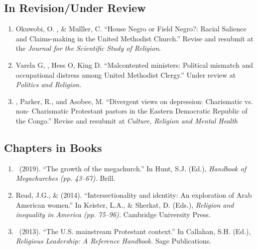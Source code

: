 \subsection*{In Revision/Under Review}
\begin{enumerate}
\item Okuwobi, O. \Eagle, \& Mulller, C. ``House Negro or Field Negro?: Racial Salience and Claims-making in the United Methodist Church.'' Revise and resubmit at the \textit{Journal for the Scientific Study of Religion}.

\item Varela G, \Eagle, Hess O, King D. ``Malcontented ministers: Political mismatch and occupational distress among United Methodist Clergy.'' Under review at \textit{Politics and Religion.}

\item \Eagle, Parker, R., and Asobee, M. ``Divergent views on depression: Charismatic vs. non- Charismatic Protestant pastors in the Eastern Democratic Republic of the Congo.'' Revise and resubmit at \textit{Culture, Religion and Mental Health}




\end{enumerate}

\subsection*{Chapters in Books}
\begin{enumerate} 
\item \Eagle\ (2019). ``The growth of the megachurch.'' In Hunt, S.J. (Ed.), \emph{Handbook of Megachurches (pp. 43--67).} Brill.

\item Read, J.G., \& \Eagle \hspace{.01em}  (2014). ``Intersectionality and identity: An exploration of Arab American women.'' In Keister, L.A., \& Sherkat, D. (Eds.), \emph{Religion and inequality in America (pp. 75--96).} Cambridge University Press.

\item \Eagle\ (2013). ``The U.S. mainstream Protestant context.'' In Callahan, S.H. (Ed.), \emph{Religious Leadership: A Reference Handbook.} Sage Publications.
\end{enumerate}

